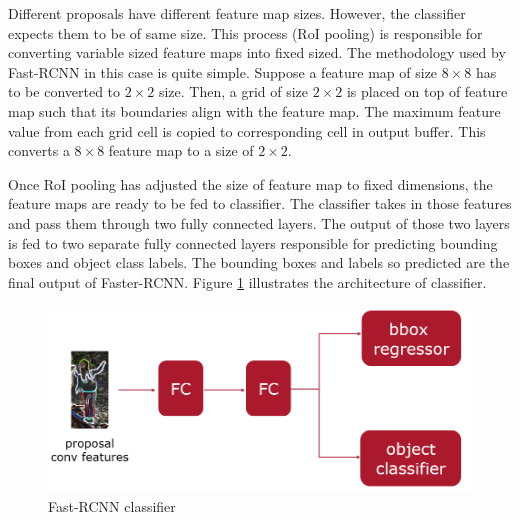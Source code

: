 Different proposals have different feature map sizes. However, the classifier expects them to be of same size. This process (RoI pooling) is responsible for converting variable sized feature maps into fixed sized. The methodology used by Fast-RCNN in this case is quite simple. Suppose a feature map of size $8\times 8$ has to be converted to $2 \times 2$ size. Then, a grid of size $2 \times 2$ is placed on top of feature map such that its boundaries align with the feature map. The maximum feature value from each grid cell is copied to corresponding cell in output buffer. This converts a $8\times 8$ feature map to a size of $2 \times 2$.

Once RoI pooling has adjusted the size of feature map to fixed dimensions, the feature maps are ready to be fed to classifier. The classifier takes in those features and pass them through two fully connected layers. The output of those two layers is fed to two separate fully connected layers responsible for predicting bounding boxes and object class labels. The bounding boxes and labels so predicted are the final output of Faster-RCNN. Figure \ref{fig:classifier} illustrates the architecture of classifier.

\begin{figure}
    \centering
    \includegraphics[width=\linewidth]{images/classifier.PNG}
    \caption{Fast-RCNN classifier}
    \label{fig:classifier}
\end{figure}


